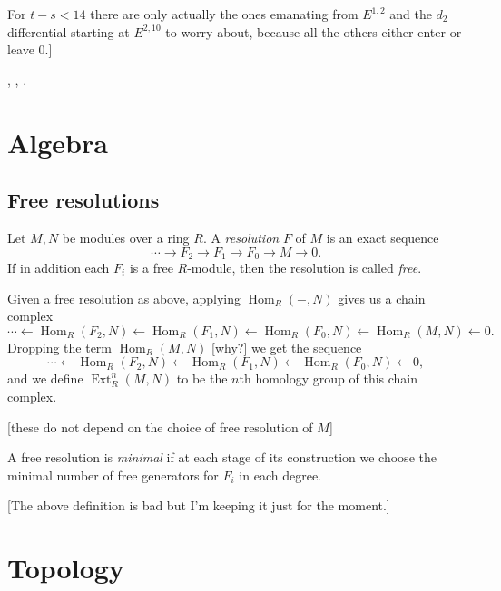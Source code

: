 \documentclass{MetricNotes2023}
\DeclareMathOperator{\Ext}{Ext}
\DeclareMathOperator{\Hom}{Hom}
\DeclareMathOperator{\im}{im}
\begin{document}
For \(t-s<14\) there are only actually the ones emanating from \(E^{1, 2}\) and the \(d_2\) differential starting at \(E^{2, 10}\) to worry about, because all the others either enter or leave \(0\).]

\autocite{stable_homotopy}, \autocite{cobordism}, \autocite{ass}.

\appendix 

\section{Algebra}

\subsection{Free resolutions}\label{2502220958}

\begin{definition}
Let \(M, N\) be modules over a ring \(R\). A \textit{resolution} \(F\) of \(M\) is an exact sequence 
\[\cdots \to F_2 \to F_1 \to F_0 \to M \to 0.\]
If in addition each \(F_i\) is a free \(R\)-module, then the resolution is called \textit{free}. 
\end{definition}

Given a free resolution as above, applying \(\Hom_R(-, N)\) gives us a chain complex
\[\cdots \leftarrow \Hom_R(F_2, N) \leftarrow \Hom_R(F_1, N) \leftarrow \Hom_R(F_0, N) \leftarrow \Hom_R(M, N) \leftarrow 0.\]
Dropping the term \(\Hom_R(M, N)\) [why?] we get the sequence
\[\cdots \leftarrow \Hom_R(F_2, N) \leftarrow \Hom_R(F_1, N) \leftarrow \Hom_R(F_0, N) \leftarrow 0,\]
and we define \(\Ext^n_R(M, N)\) to be the \(n\)th homology group of this chain complex. 


[these do not depend on the choice of free resolution of \(M\)]

A free resolution is \textit{minimal} if at each stage of its construction we choose the minimal number of free generators for \(F_i\) in each degree.

[The above definition is bad but I'm keeping it just for the moment.]

\section{Topology}
\end{document}

